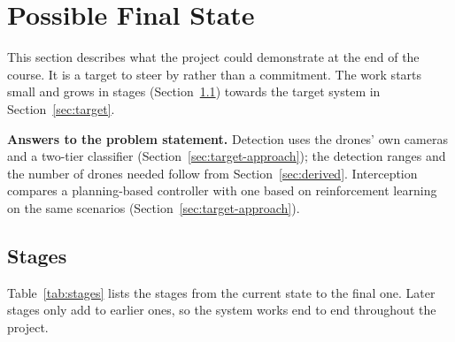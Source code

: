 \section{Possible Final State}
\label{sec:final-state}

This section describes what the project could demonstrate at the end of the
course. It is a target to steer by rather than a commitment. The work starts
small and grows in stages (Section~\ref{sec:stages}) towards the target system
in Section~\ref{sec:target}.

\textbf{Answers to the problem statement.} Detection uses the drones' own
cameras and a two-tier classifier (Section~\ref{sec:target-approach}); the
detection ranges and the number of drones needed follow from
Section~\ref{sec:derived}. Interception compares a planning-based controller
with one based on reinforcement learning on the same scenarios
(Section~\ref{sec:target-approach}).

\subsection{Stages}
\label{sec:stages}

Table~\ref{tab:stages} lists the stages from the current state to the final
one. Later stages only add to earlier ones, so the system works end to end
throughout the project.

